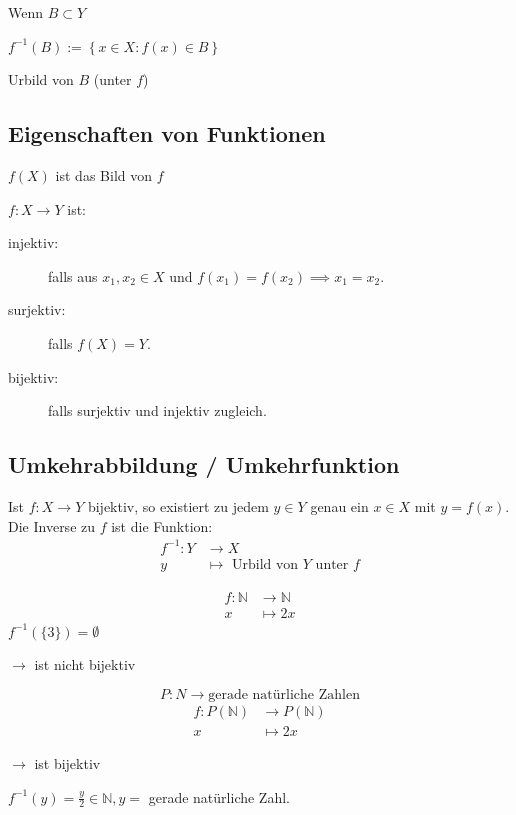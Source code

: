 \documentclass[fleqn]{scrbook}
\newenvironment{example}{{\bfseries Beispiel }}{}
\begin{document}
Wenn $B \subset Y$ 

$f^{-1}(B):=\left\{ x \in X : f(x) \in B \right\}$

Urbild von $B$ (unter $f$)

\subsection{Eigenschaften von Funktionen}

$f(X)$ ist das Bild von $f$

$f : X \to Y$ ist:

\begin{description}
  \item[injektiv:] falls aus $x_1,x_2 \in X$ und $f(x_1)=f(x_2) \implies x_1=x_2$. 
  \item[surjektiv:] falls $f(X) = Y$.
  \item[bijektiv:] falls surjektiv und injektiv zugleich.
\end{description}

\subsection{Umkehrabbildung / Umkehrfunktion}
Ist $f : X \to Y$ bijektiv, so existiert zu jedem $y \in Y$ genau ein $x \in X$ mit $y =f(x)$. Die Inverse zu $f$ ist die Funktion: 
\begin{align*}
  f^{-1} : Y &\to X\\
  y &\mapsto \text{ Urbild von } Y \text{ unter } f
\end{align*}

\begin{example}
\begin{align*}
  f : \mathbb{N} & \to     \mathbb{N}\\
                    x & \mapsto 2x
\end{align*}
$ f^{-1}(\{3\}) = \emptyset $

$\rightarrow$ ist nicht bijektiv

\[P : N \to \text{gerade natürliche Zahlen}\]
\begin{align*}
  f : P(\mathbb{N}) & \to     P(\mathbb{N})\\
                       x & \mapsto 2x
\end{align*}
\end{example}

$\rightarrow$ ist bijektiv

$f^{-1}(y)=\frac{y}{2} \in \mathbb{N},y=$ gerade natürliche Zahl.
\end{document}
